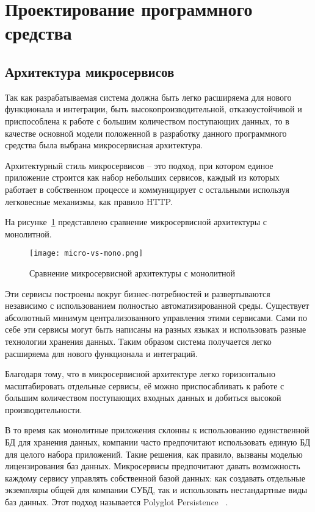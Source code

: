 \section{Проектирование программного средства}
\label{sec:design:intro}

\subsection{Архитектура микросервисов}
\label{sub:design:micro}

Так как разрабатываемая система должна быть легко расширяема для нового функционала и интеграции, быть высокопроизводительной, отказоустойчивой и приспособлена к работе с большим количеством поступающих данных, то в качестве основной модели положенной в разработку данного программного средства была выбрана микросервисная архитектура.

Архитектурный стиль микросервисов -- это подход, при котором единое приложение строится как набор небольших сервисов, каждый из которых работает в собственном процессе и коммуницирует с остальными используя легковесные механизмы, как правило HTTP. 

На рисунке~\ref{fig:micro-vs-mono} представлено сравнение микросервисной архитектуры с монолитной.

\begin{figure}[ht]
\centering
  \texttt{[image: micro-vs-mono.png]}  
  \caption{Сравнение микросервисной архитектуры с монолитной}
	\label{fig:micro-vs-mono}
\end{figure} 


Эти сервисы построены вокруг бизнес-потребностей и развертываются независимо с использованием полностью автоматизированной среды. Существует абсолютный минимум централизованного управления этими сервисами. Сами по себе эти сервисы могут быть написаны на разных языках и использовать разные технологии хранения данных. Таким образом система получается легко расширяема для нового функционала и интеграций.

Благодаря тому, что в микросервисной архитектуре легко горизонтально масштабировать отдельные сервисы, её можно приспосабливать к работе с большим количеством поступающих входных данных и добиться высокой производительности.

В то время как монолитные приложения склонны к использованию единственной БД для хранения данных, компании часто предпочитают использовать единую БД для целого набора приложений. Такие решения, как правило, вызваны моделью лицензирования баз данных. Микросервисы предпочитают давать возможность каждому сервису управлять собственной базой данных: как создавать отдельные экземпляры общей для компании СУБД, так и использовать нестандартные виды баз данных. Этот подход называется Polyglot Persistence ~\cite{micro}.

